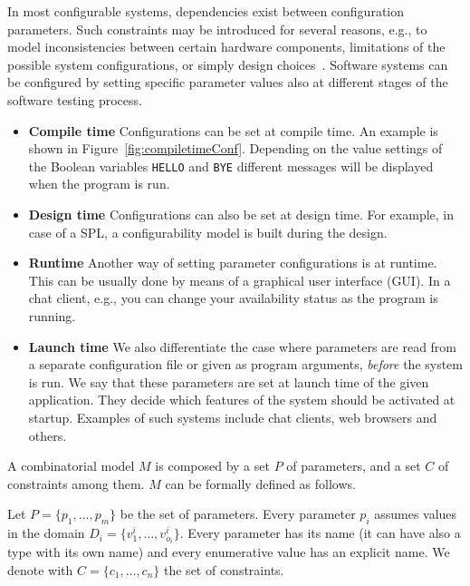 In most configurable systems, dependencies exist between configuration parameters. 
Such constraints may be introduced for several reasons, e.g., to model inconsistencies between certain hardware components, limitations of the possible system configurations, or simply design choices~\cite{CohenTSE08}. 
Software systems can be configured by setting specific parameter values also at different stages of the software testing process.
\begin{itemize}
	\item {\bf Compile time}
	Configurations can be set at compile time. An example is shown in Figure~\ref{fig:compiletimeConf}. Depending on the value settings of the Boolean variables \texttt{HELLO} and \texttt{BYE} different messages will be displayed when the program is run.
	\item {\bf Design time}
	Configurations can also be set at design time. For example, in case of a SPL, a configurability model is built during the design. 
	\item {\bf Runtime}
	Another way of setting parameter configurations is at runtime. This can be usually done by means of a graphical user interface (GUI). In a chat client, e.g., you can change your availability status as the program is running. 
	\item  {\bf Launch time}
	We also differentiate the case where parameters are read from a separate configuration file or given as program arguments, \emph{before} the system is run. We say that these parameters are set at launch time of the given application. They decide which features of the system should be activated at startup. Examples of such systems include chat clients, web browsers and others. 
\end{itemize}

A combinatorial model $M$ is composed by a set $P$ of parameters, and a set $C$ of constraints among them. 
$M$ can be formally defined as follows.

\begin{defn}
	Let $P=\{p_{1},\dots,p_{m}\}$ be the
	set of parameters. Every parameter $p_{i}$ assumes values in the domain $D_{i}=\{v_{1}^{i},\ldots,v_{o_{i}}^{i}\}$. 
	Every parameter has its name (it can have also a type with its own name) and every enumerative value has an explicit name. We denote with $C=\{c_{1},\ldots,c_{n}\}$
	the set of constraints.
\end{defn}

